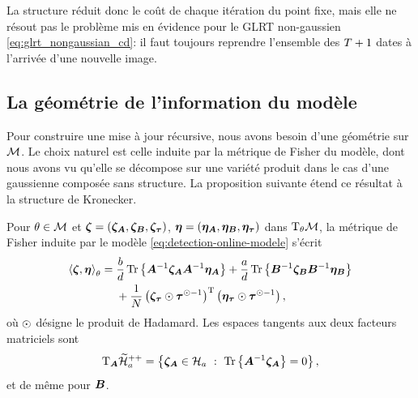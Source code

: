 La structure réduit donc le coût de chaque itération du point fixe, mais elle ne résout pas le problème mis en évidence pour le GLRT non-gaussien \eqref{eq:glrt_nongaussian_cd}: il faut toujours reprendre l'ensemble des $T+1$ dates à l'arrivée d'une nouvelle image.

\subsection{La géométrie de l'information du modèle}

Pour construire une mise à jour récursive, nous avons besoin d'une géométrie sur $\mathcal{M}$. Le choix naturel est celle induite par la métrique de Fisher du modèle, dont nous avons vu qu'elle se décompose sur une variété produit dans le cas d'une gaussienne composée sans structure. La proposition suivante étend ce résultat à la structure de Kronecker.

\begin{proposition}
\label{prop:detection-online-metrique}
  Pour $\theta\in\mathcal{M}$ et $\boldsymbol{\zeta}=(\boldsymbol{\zeta}_{\boldsymbol{A}},\boldsymbol{\zeta}_{\boldsymbol{B}},\boldsymbol{\zeta}_{\boldsymbol{\tau}})$, $\boldsymbol{\eta}=(\boldsymbol{\eta}_{\boldsymbol{A}},\boldsymbol{\eta}_{\boldsymbol{B}},\boldsymbol{\eta}_{\boldsymbol{\tau}})$ dans $\mathrm{T}_{\theta}\mathcal{M}$, la métrique de Fisher induite par le modèle \cref{eq:detection-online-modele} s'écrit
  \begin{equation}
    \begin{aligned}
      \left\langle \boldsymbol{\zeta}, \boldsymbol{\eta} \right\rangle_{\theta}
      ={}&
      \frac{b}{d}\operatorname{\operatorname{Tr}}\left\{{\boldsymbol{A}}^{-1}\boldsymbol{\zeta}_{\boldsymbol{A}}{\boldsymbol{A}}^{-1}\boldsymbol{\eta}_{\boldsymbol{A}}\right\}
      + \frac{a}{d}\operatorname{\operatorname{Tr}}\left\{{\boldsymbol{B}}^{-1}\boldsymbol{\zeta}_{\boldsymbol{B}}{\boldsymbol{B}}^{-1}\boldsymbol{\eta}_{\boldsymbol{B}}\right\}
      \\
      &+ \frac{1}{N}\left(\boldsymbol{\zeta}_{\boldsymbol{\tau}}\odot{\boldsymbol{\tau}}^{\odot-1}\right)^{\mathrm{T}}
        \left(\boldsymbol{\eta}_{\boldsymbol{\tau}}\odot{\boldsymbol{\tau}}^{\odot-1}\right),
    \end{aligned}
    \label{eq:detection-online-metrique}
  \end{equation}
  où $\odot$ désigne le produit de Hadamard. Les espaces tangents aux deux facteurs matriciels sont
  \begin{equation}
    \Tangent{\Kronleft}{\HPDdet{\dimleft}}
    = \left\{\tvec_{\Kronleft}\in\Herm{\dimleft}\ :\ \trace{\inv{\Kronleft}\tvec_{\Kronleft}}=0\right\},
    \label{eq:detection-online-tangent}
  \end{equation}
  et de même pour $\boldsymbol{B}$.
\end{proposition}

